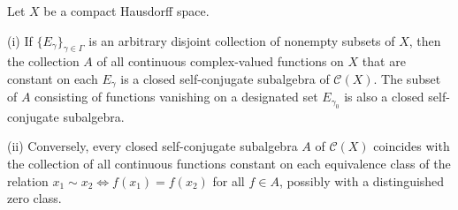 Let $X$ be a compact Hausdorff space.

(i) If $\{E_{\gamma}\}_{\gamma \in \Gamma}$ is an arbitrary disjoint collection of nonempty subsets of $X$, then the collection $A$ of all continuous complex-valued functions on $X$ that are constant on each $E_{\gamma}$ is a closed self-conjugate subalgebra of $\mathcal{C}(X)$. The subset of $A$ consisting of functions vanishing on a designated set $E_{\gamma_0}$ is also a closed self-conjugate subalgebra.

(ii) Conversely, every closed self-conjugate subalgebra $A$ of $\mathcal{C}(X)$ coincides with the collection of all continuous functions constant on each equivalence class of the relation $x_1 \sim x_2 \iff f(x_1) = f(x_2)$ for all $f \in A$, possibly with a distinguished zero class.
